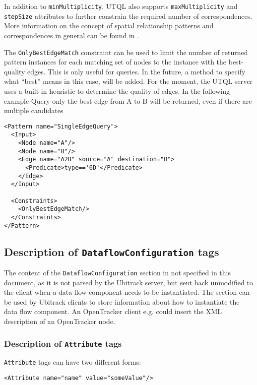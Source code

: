 \documentclass[11pt]{article}
\begin{document}
In addition to \texttt{minMultiplicity}, UTQL also supports \texttt{maxMultiplicity} and \texttt{stepSize} attributes to further constrain the required number of correspondences. More information on the concept of spatial
relationship patterns and correspondences in general can be found in \cite{pustka2006patterns}.

The \texttt{OnlyBestEdgeMatch} constraint can be used to limit the number of returned pattern instances for each matching set of nodes to the instance with the best-quality edges. This is only useful for queries. In the future, a method to specify what ``best'' means in this case, will be added. For the moment, the UTQL server uses a built-in heuristic to determine the quality of edges. In the following example Query only the best edge from A to B will be returned, even if there are multiple candidates

\begin{Verbatim}[fontsize=\footnotesize,tabsize=2] 
<Pattern name="SingleEdgeQuery">
  <Input>
    <Node name="A"/>
    <Node name="B"/>
    <Edge name="A2B" source="A" destination="B">
      <Predicate>type=='6D'</Predicate>
    </Edge>
  </Input>

  <Constraints>
    <OnlyBestEdgeMatch/>
  </Constraints>
</Pattern>
\end{Verbatim} 


\subsection{Description of \texttt{DataflowConfiguration} tags}
\label{dataflowconfiguration}

The content of the \texttt{DataflowConfiguration}
section in not specified in this document, as it is not parsed by the Ubitrack
server, but sent back unmodified to the client when a data flow component needs
to be instantiated. The section can be used by Ubitrack clients to store
information about how to instantiate the data flow component. An OpenTracker
client e.g. could insert the XML description of an OpenTracker node.

\subsubsection{Description of \texttt{Attribute} tags}
\label{attribute}

\texttt{Attribute} tags can have two different forms:

\begin{Verbatim}[fontsize=\footnotesize,tabsize=2]
<Attribute name="name" value="someValue"/>
\end{Verbatim}
\end{document}

